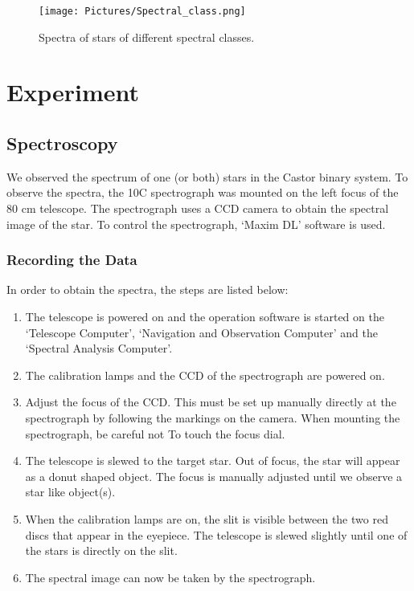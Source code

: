 \documentclass[12pt,a4paper]{article}
\begin{document}
    \begin{figure}[H]
      \centering
      \texttt{[image: Pictures/Spectral\_class.png]}
      \caption{Spectra of stars of different spectral classes.}
      \label{fig:spec_class}
    \end{figure}
\section{Experiment} 
\label{sec:experiment}
\subsection{Spectroscopy}
    We observed the spectrum of one (or both) stars in the Castor binary system. To observe the spectra, the 10C spectrograph was mounted on the 
    left focus of the 80 cm telescope. The spectrograph uses a CCD camera to obtain the spectral image of the star. To control the spectrograph, `Maxim DL'
    software is used. 
    \subsubsection{Recording the Data}
      In order to obtain the spectra, the steps are listed below:
      \begin{enumerate}
        \item The telescope is powered on and the operation software is started on the `Telescope Computer', `Navigation and Observation Computer' and the `Spectral Analysis Computer'.
        \item The calibration lamps and the CCD of the spectrograph are powered on.
        \item Adjust the focus of the CCD. This must be set up manually directly at the spectrograph by following the markings on the camera. When mounting the spectrograph, be careful not To
              touch the focus dial.
        \item The telescope is slewed to the target star. Out of focus, the star will appear as a donut shaped object. The focus is manually adjusted until we observe a star like object(s).
        \item When the calibration lamps are on, the slit is visible between the two red discs that appear in the eyepiece. The telescope is slewed slightly until one of the stars is directly on the slit. 
        \item The spectral image can now be taken by the spectrograph. 
      \end{enumerate}
\end{document}
